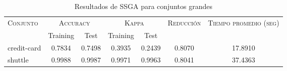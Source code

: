 \begin{table}[]
\centering
\begin{tabular}{l c c c c c c}
\hline
\multirow{2}{*}{\textsc{Conjunto}}
	& \multicolumn{2}{c}{\textsc{Accuracy}}
	& \multicolumn{2}{c}{\textsc{Kappa}}
	& \textsc{Reducción}
	& \textsc{Tiempo promedio (seg)} \\
	& Training & Test
	& Training & Test \\ 
\hline
\hline

credit-card & 0.7834 & 0.7498 & 0.3935 & 0.2439 & 0.8070 & 17.8910 \\
shuttle & 0.9988 & 0.9987 & 0.9971 & 0.9963 & 0.8041 & 37.4363 \\

\hline
\end{tabular}
\caption{Resultados de SSGA para conjuntos grandes }
\label{res-grande-ssga}
\end{table}

